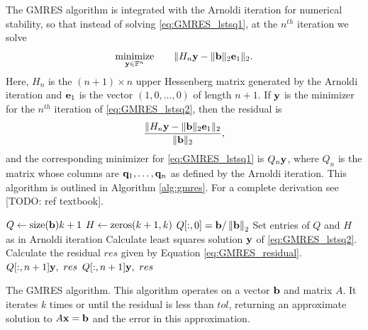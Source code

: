 The GMRES algorithm is integrated with the Arnoldi iteration for numerical stability, so that instead of solving \eqref{eq:GMRES_lstsq1}, at the $n^{th}$ iteration we solve
\begin{equation}
\underset{{\bf y} \in \mathbb{F}^n}{\text{minimize}}\qquad \|H_n {\bf y} - \|{\bf b}\|_2{\bf e}_1\|_2.
\label{eq:GMRES_lstsq2}
\end{equation}
Here, $H_n$ is the $(n+1)\times n$ upper Hessenberg matrix generated by the Arnoldi iteration and ${\bf e}_1$ is the vector $(1, 0, \ldots, 0)$ of length $n+1$.
If ${\bf y}$ is the minimizer for the $n^{th}$ iteration of \eqref{eq:GMRES_lstsq2}, then the residual is
\begin{equation}
\frac{\|H_n {\bf y} - \|{\bf b}\|_2{\bf e}_1\|_2}{\|{\bf b}\|_2},
\label{eq:GMRES_residual}
\end{equation}
and the corresponding minimizer for \eqref{eq:GMRES_lstsq1} is $Q_n{\bf y}$, where $Q_n$ is the matrix whose columns are ${\bf q}_1, \ldots, {\bf q}_n$ as defined by the Arnoldi iteration.
This algorithm is outlined in Algorithm \ref{alg:gmres}.
For a complete derivation see [TODO: ref textbook].

\begin{algorithm}
\begin{algorithmic}[1]
	\State $Q \gets \empty{\size{\b}}{k+1}$			
	\State $H \gets \zeros{k+1}{ k}$
	\State $Q[:,0] = {\bf b}/\left\lVert{\bf b}\right\rVert_2$
        \State Set entries of $Q$ and $H$ as in Arnoldi iteration
        \State Calculate least squares solution ${\bf y}$ of \ref{eq:GMRES_lstsq2}.
        \State Calculate the residual $res$ given by Equation \ref{eq:GMRES_residual}.
            \State {} $Q[:,n+1]{\bf y}, \,\, res$
        \EndIf
    \EndFor
    \State {} $Q[:,n+1]{\bf y}, \,\, res$						
\EndProcedure
\end{algorithmic}
\caption{The GMRES algorithm. This algorithm operates on a vector ${\bf b}$ and matrix $A$. 
It iterates $k$ times or until the residual is less than $tol$, returning an approximate solution to $A{\bf x}={\bf b}$ and the error in this approximation.}
\label{alg:gmres}
\end{algorithm}


